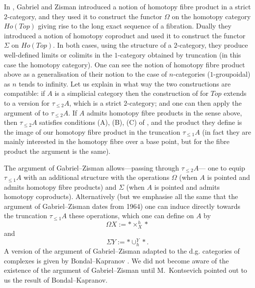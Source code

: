 In \cite{GabrielZisman}, Gabriel and Zisman introduced a notion of homotopy
fibre product in a strict $2$-category, and they used it
to construct the functor $\Omega$ on the homotopy category $Ho(Top)$
giving rise to the long exact sequence of a fibration. Dually they
introduced a
notion of homotopy coproduct and used it to construct the
functor $\Sigma$
on $Ho(Top)$. In both cases, using the structure of a
$2$-category, they
produce well-defined limits or colimits in the
$1$-category obtained by truncation (in this case the homotopy
category). One can see the notion of homotopy fibre product above
as a generalisation of their notion to the case of
$n$-categories ($1$-groupoidal)
as $n$ tends to infinity. Let us explain in what way the two constructions
are compatible:
if $A$ is a simplicial category then the construction of
\cite{GabrielZisman}
for $Top$ extends to a version for $\tau _{\leq 2}A$, which is a
strict $2$-category; and one can then apply the argument of
\cite{GabrielZisman} to
$\tau _{\leq 2}A$. If $A$ admits homotopy fibre products in the sense
above, then $\tau _{\leq 2}A$ satisfies conditions (A), (B),
(C)
of \cite{GabrielZisman},
and the product they define is the image of our homotopy
fibre product in the truncation $\tau _{\leq 1}A$
(in fact they are mainly interested in
the homotopy fibre over a base point, but for the fibre
product the argument is the same).

The argument of Gabriel--Zisman allows---passing through $\tau _{\leq 2}A$---
one to equip $\tau _{\leq 1}A$
with an additional structure with the
operations $\Omega$ (when $A$ is pointed and admits
homotopy fibre products) and $\Sigma$ (when $A$ is pointed and admits
homotopy coproducts). Alternatively
(but we emphasise all the same that the argument of Gabriel--Zisman
dates from 1964) one can induce directly towards
the truncation $\tau _{\leq 1}A$ these operations, which one can define
on $A$ by
$$
\Omega X := \ast \times ^h_X \ast
$$
and
$$
\Sigma Y:= \ast \cup _h^Y \ast .
$$
A version of the argument of Gabriel--Zisman adapted to the d.g. categories
of complexes is given by Bondal--Kapranov
\cite{BondalKapranov}. We did not become aware of the existence of
the argument of Gabriel--Zisman until M.~Kontsevich pointed out to us
the result of Bondal--Kapranov.
